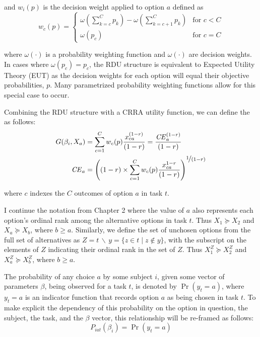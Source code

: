 \documentclass[../main.tex]{subfiles}
\begin{document}
\noindent and $w_i(p)$ is the decision weight applied to option $a$ defined as
\begin{equation}
	\label{eq3:dweight}
	w_c(p) =
	\begin{cases}
		\omega\left(\displaystyle\sum_{k=c}^C p_k\right) - \omega\left(\displaystyle\sum_{k=c+1}^C p_k\right) & \text{for } c<C \\
		\omega(p_c) & \text{for } c = C
	\end{cases}
\end{equation}

\noindent where $\omega(\cdot)$ is a probability weighting function and $\omega(\cdot)$ are decision weights.
In cases where $\omega(p_c) = p_c$, the RDU structure is equivalent to Expected Utility Theory (EUT) as the decision weights for each option will equal their objective probabilities, $p$.
Many parametrized probability weighting functions allow for this special case to occur.

Combining the RDU structure with a CRRA utility function, we can define the {\CE} as follows:
\begin{align}
	\label{eq3:CEcalc}
	\begin{split}
		G(\beta_i,X_a) &= \sum_{c=1}^{C} w_c(p) \frac{x_{ca}^{(1-r)}}{(1-r)} = \frac{ {\mathit{CE}}_a^{(1-r)}}{(1-r)}\\
		{\mathit{CE}}_a &=  \left( (1-r) \times \sum_{c=1}^{C} w_c(p) \frac{x_{ca}^{1-r}}{(1-r)} \right)^{ \displaystyle\nicefrac{1}{(1-r)} }
	\end{split}
\end{align}

\noindent where $c$ indexes the $C$ outcomes of option $a$ in task $t$.


I continue the notation from Chapter 2 where the value of $a$ also represents each option's ordinal rank among the alternative options in task $t$.
Thus $X_1 \succcurlyeq X_2$ and $X_a \succcurlyeq X_b$, where $b \geq a$.
Similarly, we define the set of unchosen options from the full set of alternatives as $Z = t \,\backslash\, y = \{z \in t \;|\; z \notin y \}$, with the subscript on the elements of $Z$ indicating their ordinal rank in the set of $Z$.
Thus $X_1^Z \succcurlyeq X_2^Z$ and $X_a^Z \succcurlyeq X_b^Z$, where $b \geq a$.

The probability of any choice $a$ by some subject $i$, given some vector of parameters $\beta$, being observed for a task $t$, is denoted by $\Pr( y_t = a)$, where $y_t = a$ is an indicator function that records option $a$ as being chosen in task $t$.
To make explicit the dependency of this probability on the option in question, the subject, the task, and the $\beta$ vector, this relationship will be re-framed as follows:
\begin{equation}
	\label{eq3:Piat}
	P_{iat}(\beta_i) = \Pr(y_t = a)
\end{equation}
\end{document}
